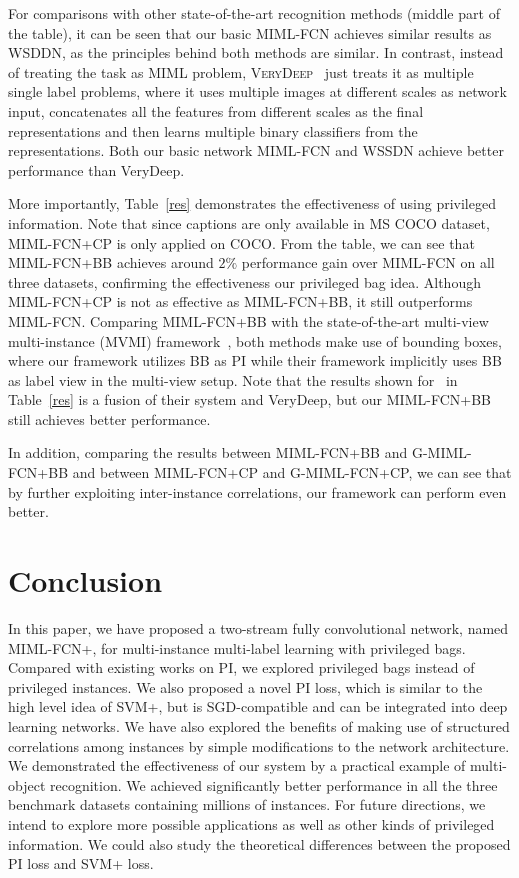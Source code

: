 \documentclass[10pt,twocolumn,letterpaper]{article}
\begin{document}
For comparisons with other state-of-the-art recognition methods
(middle part of the table), it can be seen that our basic MIML-FCN
achieves similar results as WSDDN, as the principles behind both
methods are similar. In contrast, instead of treating the task as
MIML problem, \textsc{VeryDeep}~\cite{Simonyan2014} just treats it
as multiple single label problems, where it uses multiple images
at different scales as network input, concatenates all the
features from different scales as the final representations and
then learns multiple binary classifiers from the representations.
Both our basic network \textsc{MIML-FCN} and \textsc{WSSDN}
achieve better performance than VeryDeep.

More importantly, Table~\ref{res} demonstrates the effectiveness
of using privileged information. Note that since captions are only
available in \textsc{MS COCO} dataset, MIML-FCN+CP is only applied
on COCO. From the table, we can see that \textsc{MIML-FCN+BB}
achieves around $2\%$ performance gain over MIML-FCN on all three
datasets, confirming the effectiveness our privileged bag idea.
Although \textsc{MIML-FCN+CP} is not as effective as
\textsc{MIML-FCN+BB}, it still outperforms \textsc{MIML-FCN}.
Comparing \textsc{MIML-FCN+BB} with the state-of-the-art
multi-view multi-instance (MVMI) framework~\cite{Yang2016a}, both
methods make use of bounding boxes, where our framework utilizes
BB as PI while their framework implicitly uses BB as label view in
the multi-view setup. Note that the results shown
for~\cite{Yang2016a} in Table~\ref{res} is a fusion of their
system and VeryDeep, but our \textsc{MIML-FCN+BB} still achieves
better performance.

In addition, comparing the results between MIML-FCN+BB and
G-MIML-FCN+BB and between MIML-FCN+CP and G-MIML-FCN+CP, we can
see that by further exploiting inter-instance correlations, our
framework can perform even better.



\section{Conclusion}
In this paper, we have proposed a two-stream fully convolutional
network, named MIML-FCN+, for multi-instance multi-label learning
with privileged bags. Compared with existing works on PI, we
explored privileged bags instead of privileged instances. We also
proposed a novel PI loss, which is similar to the high level idea
of SVM+, but is SGD-compatible and can be integrated into deep
learning networks. We have also explored the benefits of making
use of structured correlations among instances by simple
modifications to the network architecture. We demonstrated the
effectiveness of our system by a practical example of multi-object
recognition. We achieved significantly better performance in all
the three benchmark datasets containing millions of instances. For future directions, we intend to explore more possible applications
as well as other kinds of privileged information. We could also study the theoretical differences between the proposed PI loss and SVM+ loss.

{\small
	
	
}
\end{document}
